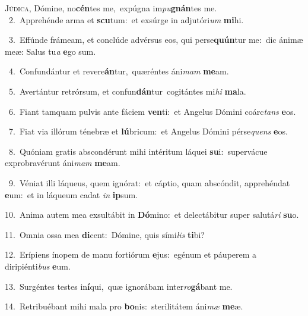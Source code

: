 \lettrine{\initial\textcolor{\initialcolor}{J}}{údica,} Dómine, no\-\textbf{cén}\-tes me,~\star expúgna im\-\textit{pu}\-\textbf{gnán}tes me.\\
{\numbfont\textcolor{\numbcolor}{~2.}}~Apprehénde arma et \textbf{scu}\-tum:~\star et exsúrge in adjutóri\textit{um} \textbf{mi}\-hi.\par
{\numbfont\textcolor{\numbcolor}{~3.}}~Effúnde frámeam, et conclúde advérsus eos, qui perse\-\textbf{quún}\-tur me:~\star dic ánimæ meæ: Salus tu\textit{a} \textbf{e}\-go sum.\par
{\numbfont\textcolor{\numbcolor}{~4.}}~Confundántur et revere\-\textbf{án}\-tur,~\star quæréntes áni\textit{mam} \textbf{me}\-am.\par
{\numbfont\textcolor{\numbcolor}{~5.}}~Avertántur retrórsum, et confun\-\textbf{dán}\-tur~\star cogitántes mi\textit{hi} \textbf{ma}\-la.\par
{\numbfont\textcolor{\numbcolor}{~6.}}~Fiant tamquam pulvis ante fáciem \textbf{ven}\-ti:~\star et Angelus Dómini coárc\textit{tans} \textbf{e}\-os.\par
{\numbfont\textcolor{\numbcolor}{~7.}}~Fiat via illórum ténebræ et \textbf{lú}\-bricum:~\star et Angelus Dómini pérse\textit{quens} \textbf{e}\-os.\par
{\numbfont\textcolor{\numbcolor}{~8.}}~Quóniam gratis abscondérunt mihi intéritum láquei \textbf{su}\-i:~\star supervácue exprobravérunt áni\textit{mam} \textbf{me}\-am.\par
{\numbfont\textcolor{\numbcolor}{~9.}}~Véniat illi láqueus, quem ignórat:~\dagger et cáptio, quam abscóndit, apprehéndat \textbf{e}\-um:~\star et in láqueum cadat \textit{in} \textbf{ip}\-sum.\par
{\numbfont\textcolor{\numbcolor}{10.}}~Anima autem mea exsultábit in \textbf{Dó}\-mino:~\star et delectábitur super salutá\textit{ri} \textbf{su}\-o.\par
{\numbfont\textcolor{\numbcolor}{11.}}~Omnia ossa mea \textbf{di}\-cent:~\star Dómine, quis sími\textit{lis} \textbf{ti}\-bi?\par
{\numbfont\textcolor{\numbcolor}{12.}}~Erípiens ínopem de manu fortiórum \textbf{e}\-jus:~\star egénum et páuperem a diripiénti\textit{bus} \textbf{e}\-um.\par
{\numbfont\textcolor{\numbcolor}{13.}}~Surgéntes testes in\-\textbf{í}\-qui,~\star quæ ignorábam inter\-\textit{ro}\-\textbf{gá}bant me.\par
{\numbfont\textcolor{\numbcolor}{14.}}~Retribuébant mihi mala pro \textbf{bo}\-nis:~\star sterilitátem áni\textit{mæ} \textbf{me}\-æ.\par
